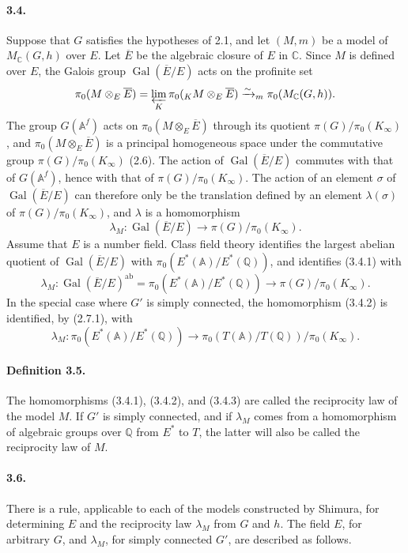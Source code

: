\documentclass[10pt]{article}
\newcommand{\A}{\mathbb A}
\newcommand{\Af}{\mathbb A^f}
\newcommand{\C}{\mathbb C}
\newcommand{\Q}{\mathbb Q}
\newcommand{\Gal}{\operatorname{Gal}}
\newcommand{\limproj}{\varprojlim}
\newcommand{\MC}{M_{\C}}
\newcommand{\ab}{\mathrm{ab}}
\begin{document}
\paragraph{3.4.} Suppose that $G$ satisfies the hypotheses of 2.1, and let $(M,m)$ be a model of $\MC(G,h)$ over $E$. Let $\overline E$ be the algebraic closure of $E$ in $\C$. Since $M$ is defined over $E$, the Galois group $\Gal(\overline E/E)$ acts on the profinite set
\[
\pi_0(M\otimes_E\overline E)=\limproj_K\pi_0({}_K M\otimes_E\overline E)\xrightarrow{\sim}_{m}\pi_0(\MC(G,h)).
\]
The group $G(\Af)$ acts on $\pi_0(M\otimes_E\overline E)$ through its quotient $\pi(G)/\pi_0(K_\infty)$, and $\pi_0(M\otimes_E\overline E)$ is a principal homogeneous space under the commutative group $\pi(G)/\pi_0(K_\infty)$ (2.6). The action of $\Gal(\overline E/E)$ commutes with that of $G(\Af)$, hence with that of $\pi(G)/\pi_0(K_\infty)$. The action of an element $\sigma$ of $\Gal(\overline E/E)$ can therefore only be the translation defined by an element $\lambda(\sigma)$ of $\pi(G)/\pi_0(K_\infty)$, and $\lambda$ is a homomorphism
\[
\lambda_M:\Gal(\overline E/E)\longrightarrow \pi(G)/\pi_0(K_\infty).\tag{3.4.1}
\]
Assume that $E$ is a number field. Class field theory identifies the largest abelian quotient of $\Gal(\overline E/E)$ with $\pi_0(E^*(\A)/E^*(\Q))$, and identifies (3.4.1) with
\[
\lambda_M:\Gal(\overline E/E)^{\ab}=\pi_0(E^*(\A)/E^*(\Q))\longrightarrow\pi(G)/\pi_0(K_\infty).\tag{3.4.2}
\]
In the special case where $G'$ is simply connected, the homomorphism (3.4.2) is identified, by (2.7.1), with
\[
\lambda_M:\pi_0(E^*(\A)/E^*(\Q))\longrightarrow\pi_0(T(\A)/T(\Q))/\pi_0(K_\infty).\tag{3.4.3}
\]

\paragraph{Definition 3.5.} The homomorphisms (3.4.1), (3.4.2), and (3.4.3) are called the reciprocity law of the model $M$. If $G'$ is simply connected, and if $\lambda_M$ comes from a homomorphism of algebraic groups over $\Q$ from $E^*$ to $T$, the latter will also be called the reciprocity law of $M$.

\paragraph{3.6.} There is a rule, applicable to each of the models constructed by Shimura, for determining $E$ and the reciprocity law $\lambda_M$ from $G$ and $h$. The field $E$, for arbitrary $G$, and $\lambda_M$, for simply connected $G'$, are described as follows.
\end{document}
